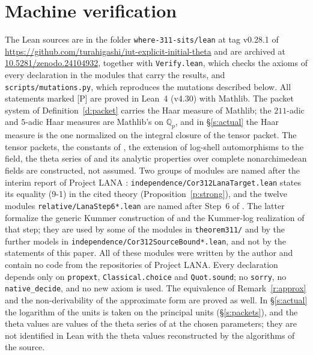 \documentclass[11pt]{article}
\theoremstyle{plain}
\theoremstyle{definition}
\theoremstyle{remark}
\newcommand{\Pmark}{\textup{[P]}}
\newcommand{\ArtifactDOI}{\href{https://doi.org/10.5281/zenodo.24104932}{10.5281/zenodo.24104932}}
\begin{document}
\section{Machine verification}\label{s:lean}

The Lean sources are in the folder \texttt{where-311-sits/lean} at tag v0.28.1 of
\url{https://github.com/turahigashi/iut-explicit-initial-theta} and are archived at
\ArtifactDOI{}, together
with \texttt{Verify.lean}, which checks the axioms of every declaration in the modules that
carry the results, and \texttt{scripts/mutations.py}, which reproduces the mutations
described below. All statements marked \Pmark{} are proved in Lean~4 (v4.30) with Mathlib. The packet
system of Definition~\ref{d:packet} carries the Haar measure of Mathlib; the $211$-adic
and $5$-adic Haar measures are Mathlib's on $\mathbb Q_p$, and in \S\ref{s:actual} the
Haar measure is the one normalized on the integral closure of the tensor packet. The
tensor packets, the constants of \cite[Prop.~1.1, 1.2]{IUT4}, the extension of log-shell
automorphisms to the field, the theta series of \cite[Prop.~1.4]{EtTh} and its analytic
properties over complete nonarchimedean fields are constructed, not assumed. Two groups of modules are named after the interim report of
Project LANA \cite{LANA}: \texttt{independence/Cor312LanaTarget.lean} states its equality (9-1) in
the cited theory (Proposition~\ref{p:strong}), and the twelve modules \texttt{relative/LanaStep6*.lean}
are named after Step~6 of \cite[\S6.2(g)]{LANA}. The latter formalize the generic Kummer construction
of \cite[\S6.1]{LANA} and the Kummer-log realization of that step; they are used by some of the modules in
\texttt{theorem311/} and by the further models in \texttt{independence/Cor312SourceBound*.lean}, and
not by the statements of this paper. All of these modules were written by the author and contain no
code from the repositories of Project LANA. Every
declaration depends only on \texttt{propext}, \texttt{Classical.choice} and
\texttt{Quot.sound}; no \texttt{sorry}, no \texttt{native\_decide}, and no new axiom is used.
The equivalence of Remark~\ref{r:approx} and the non-derivability of the approximate form
are proved as well. In \S\ref{s:actual} the logarithm of the units is taken on the principal
units (\S\ref{s:packets}), and the theta values are values of the theta series of
\cite[Prop.~1.4]{EtTh} at the chosen parameters; they are not identified in Lean with the
theta values reconstructed by the algorithms of the source.
\end{document}
